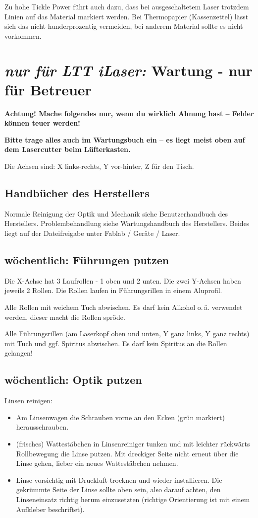 \documentclass{\basedir/fablab-document}
\newcommand{\nurLTT}{\emph{nur für LTT iLaser:} }
\begin{document}
	Zu hohe Tickle Power führt auch dazu, dass bei ausgeschaltetem Laser trotzdem Linien auf das Material markiert werden. Bei Thermopapier (Kassenzettel) lässt sich das nicht hunderprozentig vermeiden, bei anderem Material sollte es nicht vorkommen.


	\section{\nurLTT Wartung - nur für Betreuer}
	\label{sec:wartung-ltt}
	\textbf{Achtung! Mache folgendes nur, wenn du wirklich Ahnung hast -- Fehler können teuer werden!}

	\textbf{Bitte trage alles auch im Wartungsbuch ein -- es liegt meist oben auf dem Lasercutter beim Lüfterkasten.}

	Die Achsen sind: X links-rechts, Y vor-hinter, Z für den Tisch.

	\subsection{Handbücher des Herstellers}
	Normale Reinigung der Optik und Mechanik siehe Benutzerhandbuch des Herstellers. Problembehandlung siehe Wartungshandbuch des Herstellers. Beides liegt auf der Dateifreigabe unter Fablab / Geräte / Laser.

	\subsection{wöchentlich: Führungen putzen}
	Die X-Achse hat 3 Laufrollen - 1 oben und 2 unten. Die zwei Y-Achsen haben jeweils 2 Rollen. Die Rollen laufen in Führungsrillen in einem Aluprofil.

	Alle Rollen mit weichem Tuch abwischen. Es darf kein Alkohol o.\,ä. verwendet werden, dieser macht die Rollen spröde.

	Alle Führungsrillen (am Laserkopf oben und unten, Y ganz links, Y ganz rechts) mit Tuch und ggf. Spiritus abwischen. Es darf kein Spiritus an die Rollen gelangen!

	\subsection{wöchentlich: Optik putzen}

	Linsen reinigen:
	\begin{itemize}
		\item Am Linsenwagen die Schrauben vorne an den Ecken (grün markiert) herausschrauben.
		\item (frisches) Wattestäbchen in Linsenreiniger tunken und mit leichter rückwärts Rollbewegung die Linse putzen. Mit dreckiger Seite nicht erneut über die Linse gehen, lieber ein neues Wattestäbchen nehmen.
		\item Linse vorsichtig mit Druckluft trocknen und wieder installieren. Die gekrümmte Seite der Linse sollte oben sein, also darauf achten, den Linseneinsatz richtig herum einzusetzten (richtige Orientierung ist mit einem Aufkleber beschriftet).
	\end{itemize}
\end{document}
